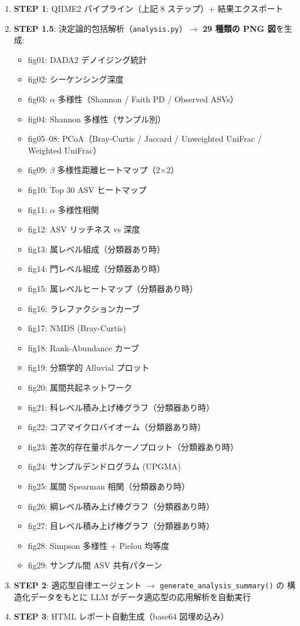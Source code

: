 \documentclass[12pt, a4paper]{article}
\begin{document}
\begin{enumerate}[leftmargin=2em]
  \item \textbf{STEP 1}: QIIME2 パイプライン（上記 8 ステップ）+ 結果エクスポート
  \item \textbf{STEP 1.5}: 決定論的包括解析（\texttt{analysis.py}）$\to$ \textbf{29 種類の PNG 図}を生成:
    \begin{itemize}
      \item fig01: DADA2 デノイジング統計
      \item fig02: シーケンシング深度
      \item fig03: $\alpha$ 多様性（Shannon / Faith PD / Observed ASVs）
      \item fig04: Shannon 多様性（サンプル別）
      \item fig05--08: PCoA（Bray-Curtis / Jaccard / Unweighted UniFrac / Weighted UniFrac）
      \item fig09: $\beta$ 多様性距離ヒートマップ（2$\times$2）
      \item fig10: Top 30 ASV ヒートマップ
      \item fig11: $\alpha$ 多様性相関
      \item fig12: ASV リッチネス vs 深度
      \item fig13: 属レベル組成（分類器あり時）
      \item fig14: 門レベル組成（分類器あり時）
      \item fig15: 属レベルヒートマップ（分類器あり時）
      \item fig16: ラレファクションカーブ
      \item fig17: NMDS (Bray-Curtis)
      \item fig18: Rank-Abundance カーブ
      \item fig19: 分類学的 Alluvial プロット
      \item fig20: 属間共起ネットワーク
      \item fig21: 科レベル積み上げ棒グラフ（分類器あり時）
      \item fig22: コアマイクロバイオーム（分類器あり時）
      \item fig23: 差次的存在量ボルケーノプロット（分類器あり時）
      \item fig24: サンプルデンドログラム (UPGMA)
      \item fig25: 属間 Spearman 相関（分類器あり時）
      \item fig26: 綱レベル積み上げ棒グラフ（分類器あり時）
      \item fig27: 目レベル積み上げ棒グラフ（分類器あり時）
      \item fig28: Simpson 多様性 + Pielou 均等度
      \item fig29: サンプル間 ASV 共有パターン
    \end{itemize}
  \item \textbf{STEP 2}: 適応型自律エージェント $\to$ \texttt{generate\_analysis\_summary()} の
    構造化データをもとに LLM がデータ適応型の応用解析を自動実行
  \item \textbf{STEP 3}: HTML レポート自動生成（base64 図埋め込み）
\end{enumerate}
\end{document}
